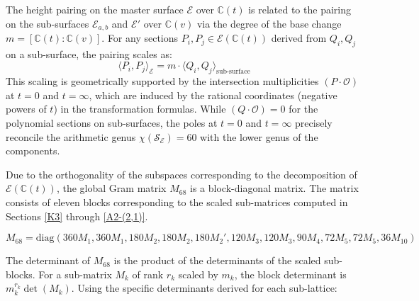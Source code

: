 \documentclass[11pt]{amsart}
\begin{document}
The height pairing on the master surface $\mathcal{E}$ over $\mathbb{C}(t)$ is related to the pairing on the sub-surfaces $\mathcal{E}_{a,b}$ and $\mathcal{E}'$ over $\mathbb{C}(v)$ via the degree of the base change $m = [\mathbb{C}(t) : \mathbb{C}(v)]$. For any sections $P_i, P_j \in \mathcal{E}(\mathbb{C}(t))$ derived from $Q_i, Q_j$ on a sub-surface, the pairing scales as:
\begin{equation}
	\langle P_i, P_j \rangle_{\mathcal{E}} = m \cdot \langle Q_i, Q_j \rangle_{\text{sub-surface}}
\end{equation}
This scaling is geometrically supported by the intersection multiplicities $(P \cdot \mathcal{O})$ at $t=0$ and $t=\infty$, which are induced by the rational coordinates (negative powers of $t$) in the transformation formulas. While $(Q \cdot \mathcal{O}) = 0$ for the polynomial sections on sub-surfaces, the poles at $t=0$ and $t=\infty$ precisely reconcile the arithmetic genus $\chi(\mathcal{S}_{\mathcal{E}}) = 60$ with the lower genus of the components.


Due to the orthogonality of the subspaces corresponding to the decomposition of $\mathcal{E}(\mathbb{C}(t))$, the global Gram matrix $M_{68}$ is a block-diagonal matrix. The matrix consists of eleven blocks corresponding to the scaled sub-matrices computed in Sections \ref{K3}  through \ref{A2-(2,1)}.



\begin{equation}
M_{68} = \text{diag}\left( 360 M_1, 360 M_1, 180 M_2, 180 M_2, 180 M_2', 120 M_3, 120 M_3, 90 M_4, 72 M_5, 72 M_5, 36 M_{10} \right)
\end{equation}


The determinant of $M_{68}$ is the product of the determinants of the scaled sub-blocks. For a sub-matrix $M_k$ of rank $r_k$ scaled by $m_k$, the block determinant is $m_k^{r_k} \det(M_k)$. Using the specific determinants derived for each sub-lattice:
\end{document}
